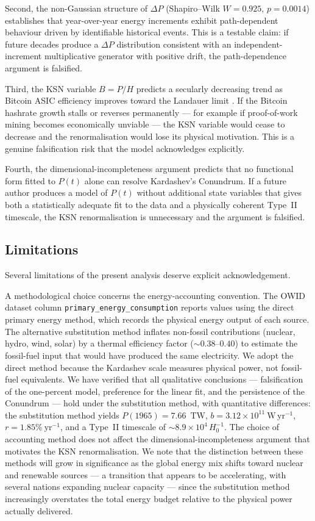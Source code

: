 Second, the non-Gaussian structure of $\Delta P$ (Shapiro--Wilk $W=0.925$, $p=0.0014$)
establishes that year-over-year energy increments exhibit path-dependent behaviour driven
by identifiable historical events. This is a testable claim: if future decades produce a
$\Delta P$ distribution consistent with an independent-increment multiplicative generator
with positive drift, the path-dependence argument is falsified.

Third, the KSN variable $B=P/H$ predicts a secularly decreasing trend as Bitcoin ASIC
efficiency improves toward the Landauer limit \citep{Landauer1961}. If the Bitcoin
hashrate growth stalls or reverses permanently --- for example if proof-of-work mining
becomes economically unviable --- the KSN variable would cease to decrease and the
renormalisation would lose its physical motivation. This is a genuine falsification risk
that the model acknowledges explicitly.

Fourth, the dimensional-incompleteness argument predicts that no functional form fitted to
$P(t)$ alone can resolve Kardashev's Conundrum. If a future author produces a model of
$P(t)$ without additional state variables that gives both a statistically adequate fit to
the data and a physically coherent Type~II timescale, the KSN renormalisation is
unnecessary and the argument is falsified.

\subsection{Limitations}
\label{sec:limitations}

Several limitations of the present analysis deserve explicit acknowledgement.

A methodological choice concerns the energy-accounting convention. The OWID dataset column
\texttt{primary\_energy\_consumption} reports values using the direct primary energy
method, which records the physical energy output of each source. The alternative
substitution method inflates non-fossil contributions (nuclear, hydro, wind, solar) by a
thermal efficiency factor ($\sim0.38$--$0.40$) to estimate the fossil-fuel input that
would have produced the same electricity. We adopt the direct method because the Kardashev
scale measures physical power, not fossil-fuel equivalents. We have verified that all
qualitative conclusions --- falsification of the one-percent model, preference for the
linear fit, and the persistence of the Conundrum --- hold under the substitution method,
with quantitative differences: the substitution method yields $P(1965)=7.66$~TW,
$b=3.12\times10^{11}~\mathrm{W\,yr^{-1}}$, $r=1.85\%~\mathrm{yr^{-1}}$, and a Type~II
timescale of $\sim8.9\times10^{4}\,H_0^{-1}$. The choice of accounting method does not
affect the dimensional-incompleteness argument that motivates the KSN renormalisation. We
note that the distinction between these methods will grow in significance as the global
energy mix shifts toward nuclear and renewable sources --- a transition that appears to be
accelerating, with several nations expanding nuclear capacity --- since the substitution
method increasingly overstates the total energy budget relative to the physical power
actually delivered.

